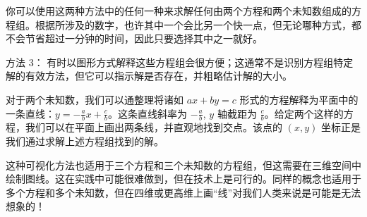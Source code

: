 你可以使用这两种方法中的任何一种来求解任何由两个方程和两个未知数组成的方程组。根据所涉及的数字，也许其中一个会比另一个快一点，但无论哪种方式，都不会节省超过一分钟的时间，因此只要选择其中之一就好。

\begin{method}{方法 3：}
    有时以图形方式解释这些方程组会很方便；这通常不是识别方程组特定解的有效方法，但它可以指示解是否存在，并粗略估计解的大小。

    对于两个未知数，我们可以通整理将诸如 $ax+by=c$ 形式的方程解释为平面中的一条直线：$y = -\frac{a}{b}x+\frac{c}{b}$。这条直线斜率为 $-\frac{a}{b}$, $y$ 轴截距为 $\frac{c}{b}$。给定两个这样的方程，我们可以在平面上画出两条线，并直观地找到交点。该点的 $(x, y)$ 坐标正是我们通过求解上述方程组找到的解。

    \begin{center}
    \end{center}

    这种可视化方法也适用于三个方程和三个未知数的方程组，但这需要在三维空间中绘制图线。这在实践中可能很难做到，但在技术上是可行的。同样的概念也适用于多个方程和多个未知数，但在四维或更高维上画“线”对我们人类来说是可能是无法想象的！
\end{method}

